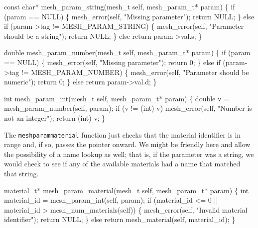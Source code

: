 \nwenddocs{}\plusendmoddef
const char* mesh_param_string(mesh_t self, mesh_param_t* param)
\{
    if (param == NULL) \{
        mesh_error(self, "Missing parameter");
        return NULL;
    \} else if (param->tag != MESH_PARAM_STRING) \{
        mesh_error(self, "Parameter should be a string");
        return NULL;
    \} else
        return param->val.s;
\}

\nwendcode{}\nwdocspar

\nwenddocs{}\plusendmoddef
double mesh_param_number(mesh_t self, mesh_param_t* param)
\{
    if (param == NULL) \{
        mesh_error(self, "Missing parameter");
        return 0;
    \} else if (param->tag != MESH_PARAM_NUMBER) \{
        mesh_error(self, "Parameter should be numeric");
        return 0;
    \} else 
        return param->val.d;
\}

\nwendcode{}\nwdocspar

\nwenddocs{}\plusendmoddef
int mesh_param_int(mesh_t self, mesh_param_t* param)
\{
    double v = mesh_param_number(self, param);
    if (v != (int) v)
        mesh_error(self, "Number is not an integer");
    return (int) v;
\}

\nwendcode{}\nwdocspar

The {\tt{}mesh{}param{}material} function just checks that the material
identifier is in range and, if so, passes the pointer onward.
We might be friendly here and allow the possibility of a name lookup
as well; that is, if the parameter was a string, we would check
to see if any of the available materials had a name that matched that
string.

\nwenddocs{}\plusendmoddef
material_t* mesh_param_material(mesh_t self, mesh_param_t* param)
\{
    int material_id = mesh_param_int(self, param);
    if (material_id <= 0 || material_id > mesh_num_materials(self)) \{
        mesh_error(self, "Invalid material identifier");
        return NULL;
    \} else
        return mesh_material(self, material_id);
\}


